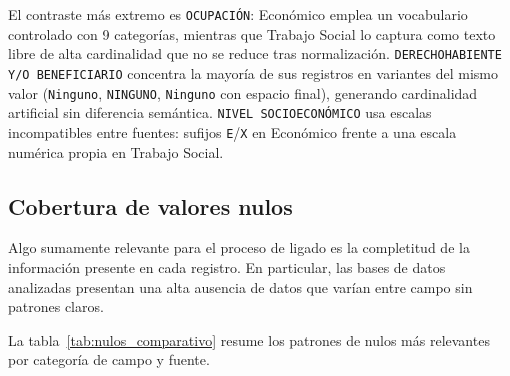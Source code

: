 El contraste más extremo es \texttt{OCUPACIÓN}: Económico emplea un vocabulario controlado con 9 categorías, mientras que Trabajo Social lo captura como texto libre de alta cardinalidad que no se reduce tras normalización. \texttt{DERECHOHABIENTE Y/O BENEFICIARIO} concentra la mayoría de sus registros en variantes del mismo valor (\texttt{Ninguno}, \texttt{NINGUNO}, \texttt{Ninguno} con espacio final), generando cardinalidad artificial sin diferencia semántica. \texttt{NIVEL SOCIOECONÓMICO} usa escalas incompatibles entre fuentes: sufijos \texttt{E}/\texttt{X} en Económico frente a una escala numérica propia en Trabajo Social.

\subsection{Cobertura de valores nulos}
Algo sumamente relevante para el proceso de ligado es la completitud de la información presente en cada registro. En particular, las bases de datos analizadas presentan una alta ausencia de datos que varían entre campo sin patrones claros.

La tabla~\ref{tab:nulos_comparativo} resume los patrones de nulos más relevantes por categoría de campo y fuente.

\begin{table}[H]
\centering
\caption{Patrones de valores nulos por campo y base de datos}
\label{tab:nulos_comparativo}
\small
{}
\end{table}

